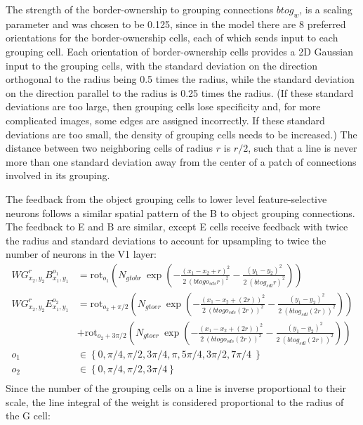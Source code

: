 The strength of the border-ownership to grouping connections $btog_w$,
is a scaling parameter and was chosen to be 0.125, since in the model
there are 8 preferred orientations for the border-ownership cells,
each of which sends input to each grouping cell.
 Each orientation of
border-ownership cells provides a 2D Gaussian input to the grouping
cells, with the standard deviation on the direction orthogonal to the
radius being 0.5 times the radius, while the standard deviation on the
direction parallel to the radius is 0.25 times the radius. (If these
standard deviations are too large, then grouping cells lose
specificity and, for more complicated images, some edges are assigned
incorrectly. If these standard deviations are too small, the density
of grouping cells needs to be increased.) The distance between two
neighboring cells of radius $r$ is $r/2$, such that a line is never
more than one standard deviation away from the center of a patch of
connections involved in its grouping.

The feedback from the object grouping cells to lower level feature-selective neurons follows a similar spatial pattern of the
B to object grouping connections. The feedback to E and B are similar,  except E cells receive feedback with twice the radius and standard deviations to account for upsampling to twice the number of neurons in the V1 layer:
\begin{align}
	WG^{r}_{x_2,y_2}B^{o_1}_{x_1,y_1}&=\text{rot}_{o_1}\left(N_{gtobr}\: \exp\left(-\frac{(x_1-x_2+r)^2}{2\: (btogo_{sds} r)^2}
	-\frac{(y_1-y_2)^2}{2\: (btog_{sdl} r)^2}\right)\right)\ \nonumber\\ 
	WG^{r}_{x_2,y_2}E^{o_2}_{x_1,y_1}&=\text{rot}_{o_2+\pi/2}\left(N_{gtoer}\: \exp\left(-\frac{(x_1-x_2+(2r))^2}{2\: (btogo_{sds} (2r))^2}
		-\frac{(y_1-y_2)^2}{2\: (btog_{sdl} (2r))^2}\right)\right)\nonumber\\
		&+\text{rot}_{o_2+3\pi/2}\left(N_{gtoer}\: \exp\left(-\frac{(x_1-x_2+(2r))^2}{2\: (btogo_{sds} (2r))^2}
				-\frac{(y_1-y_2)^2}{2\: (btog_{sdl} (2r))^2}\right)\right)\ \nonumber\\ o_1&\in \left\{0,\pi/4,\pi/2,3\pi/4,\pi,5\pi/4,3\pi/2,7\pi/4\ \right\} \nonumber\\
		o_2&\in \left\{0,\pi/4,\pi/2,3\pi/4 \right\} \nonumber\\
\end{align}
Since the number of the grouping cells on a line is
inverse proportional to their scale, the line integral of the weight
is considered proportional to the radius of the G cell: 

